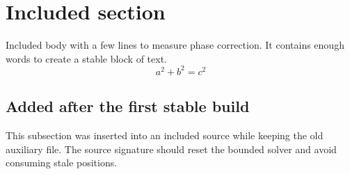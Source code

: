 \section{Included section}
Included body with a few lines to measure phase correction. It contains enough words to create a stable block of text.
\begin{equation} a^2+b^2=c^2 \end{equation}
\subsection{Added after the first stable build}
This subsection was inserted into an included source while keeping the old auxiliary file. The source signature should reset the bounded solver and avoid consuming stale positions.
